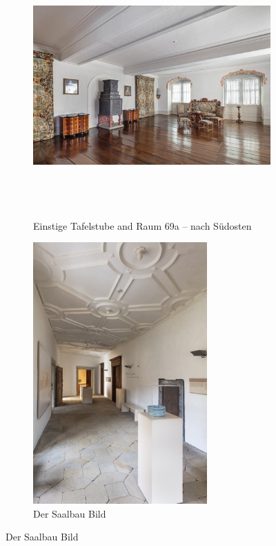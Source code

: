 \documentclass[
  a4paper,
]{book}
\begin{document}
\begin{figure}
\begin{figure}[H]    
  \includegraphics[height=10cm]{images/fmd10005852a.jpg}
  \caption{Einstige Tafelstube and Raum 69a – nach Südosten}
  \label{fig:{images/fmd10005852a.jpg}}
\end{figure}

\clearpage

\begin{figure}[H]    
  \includegraphics[height=10cm]{images/fmd10005855a.jpg}
  \caption{Der Saalbau Bild}
  \label{fig:{images/fmd10005855a.jpg}}
\end{figure}

\clearpage


\end{figure}
\end{document}
